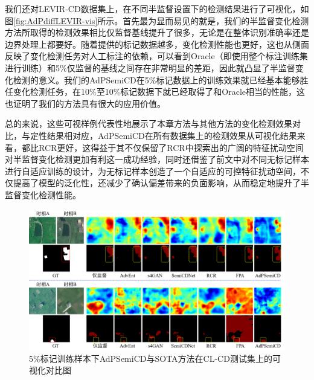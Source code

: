 \documentclass[lang=chs, degree=master, blindreview=false, adobe=false]{yanputhesis}
\begin{document}
我们还对LEVIR-CD数据集上，在不同半监督设置下的检测结果进行了可视化，如图\ref{fig:AdPdiffLEVIR-vis}所示。首先最为显而易见的就是，我们的半监督变化检测方法所取得的检测效果相比仅监督基线提升了很多，无论是在整体识别准确率还是边界处理上都要好。随着提供的标记数据越多，变化检测性能也更好，这也从侧面反映了变化检测任务对人工标注的依赖，可以看到Oracle（即使用整个标注训练集进行训练）和5$\%$仅监督的基线之间存在非常明显的差距，因此就凸显了半监督变化检测的意义。我们的AdPSemiCD在5$\%$标记数据上的训练效果就已经基本能够胜任变化检测任务，在10$\%$至10$\%$标记数据下就已经取得了和Oracle相当的性能，这也证明了我们的方法具有很大的应用价值。

总的来说，这些可视样例代表性地展示了本章方法与其他方法的变化检测效果对比，与定性结果相对应，AdPSemiCD在所有数据集上的检测效果从可视化结果来看，都比RCR更好，这得益于其不仅保留了RCR中探索出的广阔的特征扰动空间对半监督变化检测更加有利这一成功经验，同时还借鉴了前文中对不同无标记样本进行自适应训练的设计，为无标记样本创造了一个自适应的可控特征扰动空间，不仅提高了模型的泛化性，还减少了确认偏差带来的负面影响，从而稳定地提升了半监督变化检测性能。
\begin{figure}[!htbp]
  \centering
  \includegraphics[scale=0.45]{images/AdPcl-vis.png}
  \caption{
    5$\%$标记训练样本下AdPSemiCD与SOTA方法在CL-CD测试集上的可视化对比图
  }
  \label{fig:AdPCl-vis}
\end{figure}
\end{document}
